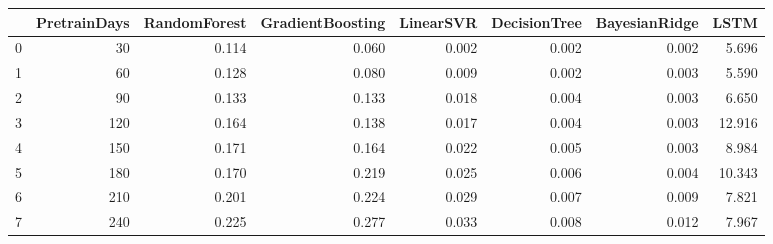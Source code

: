 \begin{tabular}{lrrrrrrr}
\toprule
{} &  PretrainDays &  RandomForest &  GradientBoosting &  LinearSVR &  DecisionTree &  BayesianRidge &   LSTM \\
\midrule
0 &            30 &         0.114 &             0.060 &      0.002 &         0.002 &          0.002 &  5.696 \\
1 &            60 &         0.128 &             0.080 &      0.009 &         0.002 &          0.003 &  5.590 \\
2 &            90 &         0.133 &             0.133 &      0.018 &         0.004 &          0.003 &  6.650 \\
3 &           120 &         0.164 &             0.138 &      0.017 &         0.004 &          0.003 & 12.916 \\
4 &           150 &         0.171 &             0.164 &      0.022 &         0.005 &          0.003 &  8.984 \\
5 &           180 &         0.170 &             0.219 &      0.025 &         0.006 &          0.004 & 10.343 \\
6 &           210 &         0.201 &             0.224 &      0.029 &         0.007 &          0.009 &  7.821 \\
7 &           240 &         0.225 &             0.277 &      0.033 &         0.008 &          0.012 &  7.967 \\
\bottomrule
\end{tabular}
